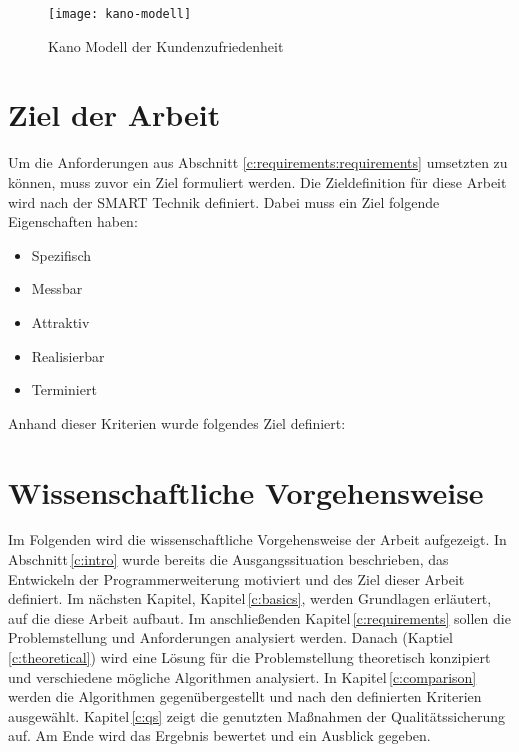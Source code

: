 \begin{figure}[h]
	\centering
	\texttt{[image: kano-modell]}
	\caption[Kano Modells]{Kano Modell der Kundenzufriedenheit}
	\label{fig:kano-model}
\end{figure}

\section{Ziel der Arbeit}
\label{c:intro:target}
Um die Anforderungen aus Abschnitt \ref{c:requirements:requirements} umsetzten zu können, muss zuvor ein Ziel formuliert werden.
Die Zieldefinition für diese Arbeit wird nach der SMART Technik definiert. Dabei muss ein Ziel folgende Eigenschaften haben:

\begin{itemize}
	\setlength\itemsep{0.01em}
	\item Spezifisch
	\item Messbar
	\item Attraktiv
	\item Realisierbar
	\item Terminiert
\end{itemize}

Anhand dieser Kriterien wurde folgendes Ziel definiert:



\section{Wissenschaftliche Vorgehensweise}
\label{c:intro:methodology:scientific_proceture}
Im Folgenden wird die wissenschaftliche Vorgehensweise der Arbeit aufgezeigt.
In Abschnitt\,\ref{c:intro} wurde bereits die Ausgangssituation beschrieben, das Entwickeln der Programmerweiterung motiviert und des Ziel dieser Arbeit definiert. Im nächsten Kapitel, Kapitel\,\ref{c:basics}, werden Grundlagen erläutert, auf die diese Arbeit aufbaut. Im anschließenden Kapitel\,\ref{c:requirements} sollen die Problemstellung und Anforderungen analysiert werden. Danach (Kaptiel\,\ref{c:theoretical}) wird eine Lösung für die Problemstellung theoretisch konzipiert und verschiedene mögliche Algorithmen analysiert. In Kapitel\,\ref{c:comparison} werden die Algorithmen gegenübergestellt und nach den definierten Kriterien ausgewählt. Kapitel\,\ref{c:qs} zeigt die genutzten Maßnahmen der Qualitätssicherung auf. Am Ende wird das Ergebnis bewertet und ein Ausblick gegeben.

